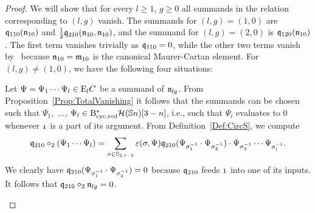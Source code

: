 \documentclass[\MainFolder/Text.tex]{subfiles}
\begin{document}
\begin{proof}
%
We will show that for every $l\ge 1$, $g\ge 0$ all summands in the relation corresponding to $(l,g)$ vanish. The summands for $(l,g)= (1,0)$ are $\mathfrak{q}_{110}(\mathfrak{n}_{10})$ and $\frac{1}{2}\mathfrak{q}_{210}(\mathfrak{n}_{10},\mathfrak{n}_{10})$, and the summand for $(l,g)=(2,0)$ is $\mathfrak{q}_{120}(\mathfrak{n}_{10})$.
The first term vanishes trivially as $\mathfrak{q}_{110}=0$, while the other two terms vanish by~\cite[Proposition 12.5]{Cieliebak2015} because $\mathfrak{n}_{10} = \mathfrak{m}_{10}$
is the canonical Maurer-Cartan element. For $(l,g)\neq (1,0)$, we have the following four situations:
\begin{description}[font=\normalfont\itshape]
\item[$\OPQ_{210}\circ_2 \PMC_{lg}$, $l\ge 2$:] 
Let $\Psi = \Psi_1 \cdots \Psi_l\in \mathrm{E}_l C$ be a summand of $\mathfrak{n}_{lg}$. 
 From Proposition~\ref{Prop:TotalVanishing} it follows that the summands can be chosen such that $\Psi_1$,~$\dotsc$, $\Psi_l \in \mathrm{B}_{\mathrm{cyc},\mathrm{red}}^*\mathcal{H}(\mathbb{S}{n})[3-n]$, i.e., such that $\Psi_i$ evaluates to $0$ whenever $\NOne$ is a part of its argument. From Definition~\ref{Def:CircS}, we compute
\[\mathfrak{q}_{210}\circ_2 (\Psi_1\cdots\Psi_l) = \sum_{\sigma\in \mathbb{S}_{2,l-2}} \varepsilon(\sigma,\Psi)\mathfrak{q}_{210}(\Psi_{\sigma_1^{-1}}\cdot\Psi_{\sigma_2^{-1}})\cdot\Psi_{\sigma_3^{-1}}\cdots \Psi_{\sigma_l^{-l}}. \]
We clearly have $\mathfrak{q}_{210}(\Psi_{\sigma_1^{-1}}\cdot\Psi_{\sigma_2^{-1}})=0$ because $\mathfrak{q}_{210}$ feeds $\NOne$ into one of its inputs. It follows that $\mathfrak{q}_{210}\circ_2 \mathfrak{n}_{lg} = 0$.


\end{description}
\end{proof}
\end{document}
